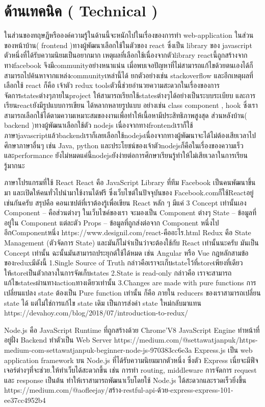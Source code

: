 \section{ด้านเทคนิค ( Technical )}
ในส่วนของทฤษฏีหรือองค์ความรู้ในด้านนี้จะหนักไปในเรื่องของการทำ
web-application ในส่วนของหน้าบ้าน( frontend )ทางผู้พัฒนาเลือกใช้ในตัวของ
react ซึ่งเป็น library ของ javascript ตัวหนึ่งที่ได้รับความนิยมเป็นอยากมาก เหตุผลที่เลือกใช้เนื่องจากตัวlibrary reactนี้ถูกสร้างจากทางfacebook 
จึงมีcommunityอย่างหนาแน่น เมื่อพบเจอปัญหาที่ไม่สามารถแก้ไขด้วยตนเองได้ก็สามารถไปค้นหาจากแหล่งcommunityเหล่านี้ได้ ยกตัวอย่างเช่น stackoverflow 
และอีกเหตุผลที่เลือกใช้ react ก็คือ เจ้าตัว redux toolsตัวนี้ช่วยอำนวยความสะดวกในเรื่องของการจัดการstatesต่างๆภายในproject ให้สามารถเรียกใช้statesต่างๆได้อย่างเป็นระบบระเบียบ และการเรียนreactยังมีรูปแบบการเขียน
ได้หลากหลายรูปแบบ อย่างเช่น class component , hook ซึ่งเราสามารถเลือกใช้ได้ตามความเหมาะสมของงานเพื่อทำให้เนื้อหามีประสิทธิภาพสูงสุด
ส่วนหลังบ้าน( backend )ทางผู้พัฒนาเลือกใช้ตัว nodejs เนื่องจากทางfrontendเราก็ใช้ภาษาjavascriptแล้วbackendเราก็เลยเลือกใช้nodejsเนื่องจากทางผู้พัฒนาจะได้ไม่ต้องเสียเวลาไปศึกษาภาษาอื่นๆ เช่น Java, python และประโยชน์ของเจ้าตัวnodejsก็คือในเรื่องของความเร็วและperformance ยังไม่หมดแค่นี้nodejsยังง่ายต่อการศึกษาเรียนรู้ทำให้ไม่เสียเวลาในการเรียนรู้มากนะ 

ภาษาโปรแกรมที่ใช้
React
React คือ JavaScript Library ที่ทีม Facebook เป็นคนพัฒนาขึ้นมา และเปิดให้คนทั่วไปนำมาใช้งานได้ฟรี ซึ่งเว็บไซต์ในปัจจุบันของ Facebook.comก็ใช้Reactอยู่เช่นกันครับ
    สรุปคือ คอนเซปต์ที่เราต้องรู้เพื่อเขียน React หลัก ๆ มีแค่ 3 Concept เท่านั้นเอง
Component – คือส่วนต่างๆ ในเว็บไซค์ของเรา จะมองเป็น Component ต่างๆ
State – ข้อมูลที่อยู่ใน Component แต่ละตัว
Props – ข้อมูลที่ถูกส่งต่อจาก Component หนึ่งไปอีกComponentหนึ่ง
https://www.designil.com/react-คืออะไร.html
Redux
คือ State Management (ตัวจัดการ State) และมันก็ไม่จำเป็นว่าจะต้องใช้กับ React เท่านั้นนะครับ มันเป็น Concept เท่านั้น ฉะนั้นมันสามารถประยุกต์ใช้ได้หมด เช่น Angular หรือ Vue
กฎหลักสามข้อของreduxมีดังนี้
	1.Single Source of Truth กล่าวคือเราจะเก็บstateไว้ที่storeเพียงที่เดียวให้storeเป็นตัวกลางในการจัดเก็บstates
	2.State is read-only กล่าวคือ เราจะสามารถแก้ไขstatesผ่านทางactionทางเดียวเท่านั้น
	3.Changes are made with pure functions การเปลี่ยนแปลง state ต้องเป็น Pure function เท่านั้น ก็คือ ภายใน reducers ของเราสามารถเปลี่ยน state ได้ แต่ไม่ใช่การแก้ไข state เดิม เป็นการส่งค่า state ใหม่กลับมาแทน
https://devahoy.com/blog/2018/07/introduction-to-redux/

Node.js
คือ JavaScript Runtime ที่ถูกสร้างด้วย Chrome’V8 JavaScript Engine ทำหน้าที่อยู่ฝั่ง Backend ทำตัวเป็น Web Server
https://medium.com/@settawatjanpuk/https-medium-com-settawatjanpuk-beginner-node-js-970383cc6e3a
Express.js
เป็น web application framework บน Node.js ที่ได้รับความนิยมมากตัวหนึ่ง
ซึ่งตัว Express เนี่ยจะมีฟีจเจอร์ต่างๆที่จะช่วย.ให้ทำเว็บได้สะดวกขึ้น เช่น การทำ routing, middleware การจัดการ request และ response เป็นต้น ทำให้เราสามารถพัฒนาเว็บโดยใช้ Node.js ได้สะดวกและรวดเร็วยิ่งขึ้น
https://medium.com/@aofleejay/สร้าง-restful-api-ด้วย-express-express-101-ee37cc4952b4




